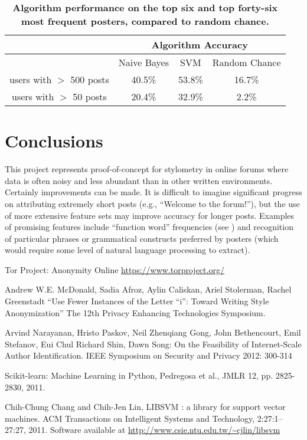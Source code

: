 \documentclass[12pt,letterpaper,onecolumn,oneside]{article}
\numberwithin{equation}{section}
\numberwithin{figure}{section}
\begin{document}
\begin{table}
\begin{center}
  \begin{tabular}{| c | c | c | c |}
    \hline
      & \multicolumn{3}{|c|}{Algorithm Accuracy} \\
    \hline
     & Naive Bayes & SVM & Random Chance \\ \hline
    users with \(>\) 500 posts & 40.5\% & 53.8\% & 16.7\% \\ \hline
    users with \(>\) 50 posts & 20.4\% & 32.9\% & 2.2\% \\ \hline
  \end{tabular}
  \caption{\textbf{\footnotesize{Algorithm performance on the top six and top forty-six most frequent posters, compared to random chance.}}}
  \label{numbers}
\end{center}
\end{table}

\section{Conclusions}
This project represents proof-of-concept for stylometry in online forums where data is often noisy and less abundant than in other written environments. Certainly improvements can be made. It is difficult to 
imagine significant progress on attributing extremely short posts (e.g., ``Welcome to the forum!''), but the use of more extensive feature sets may improve accuracy for longer posts. Examples of promising features 
include ``function word'' frequencies (see \cite{stanford}) and recognition of particular phrases or grammatical constructs preferred by posters (which would require some level of natural language processing to 
extract). 

\begin{thebibliography}{1}
\begin{singlespace}

Tor Project: Anonymity Online \url{https://www.torproject.org/}

Andrew W.E. McDonald, Sadia Afroz, Aylin Caliskan, Ariel Stolerman, Rachel Greenstadt ``Use Fewer Instances of the Letter ``i'': Toward Writing Style Anonymization'' The 12th Privacy Enhancing Technologies Symposium.

Arvind Narayanan, Hristo Paskov, Neil Zhenqiang Gong, John Bethencourt, Emil Stefanov, Eui Chul Richard Shin, Dawn Song: On the Feasibility of Internet-Scale Author Identification. IEEE Symposium on Security and Privacy 2012: 300-314

Scikit-learn: Machine Learning in Python, Pedregosa et al., JMLR 12, pp. 2825-2830, 2011.

Chih-Chung Chang and Chih-Jen Lin, LIBSVM : a library for support vector machines. ACM Transactions on Intelligent Systems and Technology, 2:27:1--27:27, 2011. Software available at \url{http://www.csie.ntu.edu.tw/~cjlin/libsvm}

\end{singlespace}
\end{thebibliography}
\end{document}
